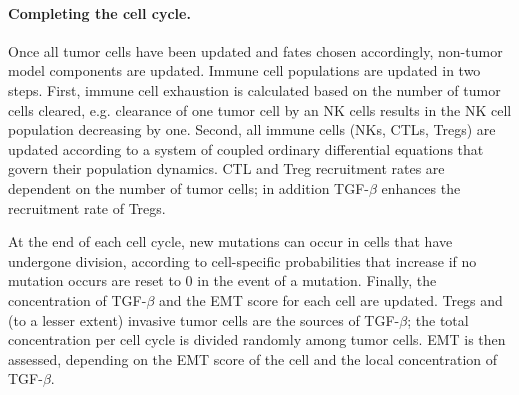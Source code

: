 \documentclass[11pt]{article}
\begin{document}


\paragraph{Completing the cell cycle.}
Once all tumor cells have been updated and fates chosen accordingly, non-tumor model components are updated. Immune cell populations are updated in two steps. First, immune cell exhaustion is calculated based on the number of tumor cells cleared, e.g. clearance of one tumor cell by an NK cells results in the NK cell population decreasing by one. Second, all immune cells (NKs, CTLs, Tregs) are updated according to a system of coupled ordinary differential equations that govern their population dynamics. CTL and Treg recruitment rates are dependent on the number of tumor cells; in addition  TGF-$\beta$ enhances the recruitment rate of Tregs.
\par
At the end of each cell cycle, new mutations can occur in cells that have undergone division, according to cell-specific probabilities that increase if no mutation occurs are reset to 0 in the event of a mutation. Finally, the concentration of TGF-$\beta$ and the EMT score for each cell are updated. Tregs and (to a lesser extent) invasive tumor cells are the sources of TGF-$\beta$; the total concentration per cell cycle is divided randomly among tumor cells. EMT is then assessed, depending on the EMT score of the cell and the local concentration of TGF-$\beta$.
\end{document}
